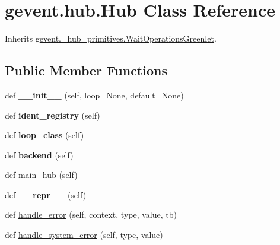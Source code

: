 \hypertarget{classgevent_1_1hub_1_1_hub}{}\section{gevent.\+hub.\+Hub Class Reference}
\label{classgevent_1_1hub_1_1_hub}


Inherits \hyperlink{classgevent_1_1__hub__primitives_1_1_wait_operations_greenlet}{gevent.\+\_\+hub\+\_\+primitives.\+Wait\+Operations\+Greenlet}.

\subsection*{Public Member Functions}
\begin{DoxyCompactItemize}
\item 
\mbox{\label{classgevent_1_1hub_1_1_hub_ad1fb038fa6978bc82fbbb2e2c46482fb}} 
def {\bfseries \+\_\+\+\_\+init\+\_\+\+\_\+} (self, loop=None, default=None)
\item 
\mbox{\label{classgevent_1_1hub_1_1_hub_a3ee20fd0da11a0a645242ef84c8cef9f}} 
def {\bfseries ident\+\_\+registry} (self)
\item 
\mbox{\label{classgevent_1_1hub_1_1_hub_a80de58ec55edcf0507dc4d00a4c916bd}} 
def {\bfseries loop\+\_\+class} (self)
\item 
\mbox{\label{classgevent_1_1hub_1_1_hub_a346f897da704d23d1fa962285d7fc0ea}} 
def {\bfseries backend} (self)
\item 
def \hyperlink{classgevent_1_1hub_1_1_hub_a7502a09ef7da152ad84ef12c357e5a1e}{main\+\_\+hub} (self)
\item 
\mbox{\label{classgevent_1_1hub_1_1_hub_aa3376516f4d6e1a63956a6ded9744fe9}} 
def {\bfseries \+\_\+\+\_\+repr\+\_\+\+\_\+} (self)
\item 
def \hyperlink{classgevent_1_1hub_1_1_hub_ac78de5705d8cf4faa04225a38f7759b5}{handle\+\_\+error} (self, context, type, value, tb)
\item 
def \hyperlink{classgevent_1_1hub_1_1_hub_a3ebc2352e96b888d64899c5b5e9ac758}{handle\+\_\+system\+\_\+error} (self, type, value)
\item 

\end{DoxyCompactItemize}

